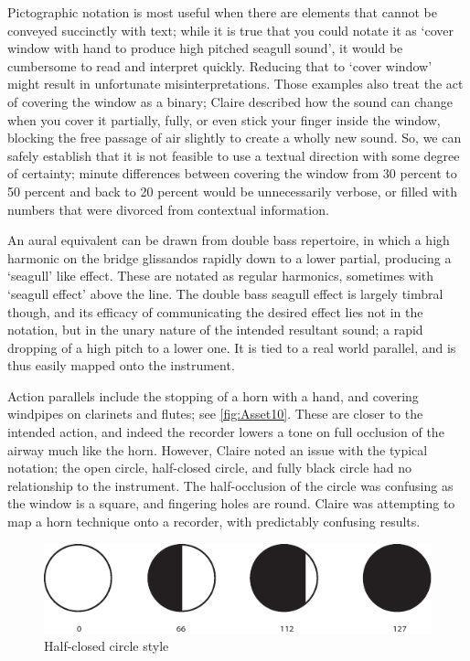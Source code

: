 Pictographic notation is most useful when there are elements that cannot be conveyed succinctly with text; while it is true that you could notate it as `cover window with hand to produce high pitched seagull sound', it would be cumbersome to read and interpret quickly. 
Reducing that to `cover window' might result in unfortunate misinterpretations. 
Those examples also treat the act of covering the window as a binary; Claire described how the sound can change when you cover it partially, fully, or even stick your finger inside the window, blocking the free passage of air slightly to create a wholly new sound. 
So, we can safely establish that it is not feasible to use a textual direction with some degree of certainty; 
minute differences between covering the window from 30 percent to 50 percent and back to 20 percent would be unnecessarily verbose, or filled with numbers that were divorced from contextual information.

An aural equivalent can be drawn from double bass repertoire, in which a high harmonic on the bridge glissandos rapidly down to a lower partial, producing a `seagull' like effect. 
These are notated as regular harmonics, sometimes with `seagull effect' above the line. 
The double bass seagull effect is largely timbral though, and its efficacy of communicating the desired effect lies not in the notation, but in the unary nature of the intended resultant sound; a rapid dropping of a high pitch to a lower one. 
It is tied to a real world parallel, and is thus easily mapped onto the instrument.

Action parallels include the stopping of a horn with a hand, and covering windpipes on clarinets and flutes; see \autoref{fig:Asset10}. 
These are closer to the intended action, and indeed the recorder lowers a tone on full occlusion of the airway much like the horn. 
However, Claire noted an issue with the typical notation; the open circle, half-closed circle, and fully black circle had no relationship to the instrument. 
The half-occlusion of the circle was confusing as the window is a square, and fingering holes are round.
Claire was attempting to map a horn technique onto a recorder, with predictably confusing results. 

\begin{figure}
    \includegraphics[width=\linewidth]{./resources/Asset 10.pdf}
    \caption{Half-closed circle style}\label{fig:Asset10}
\end{figure}


